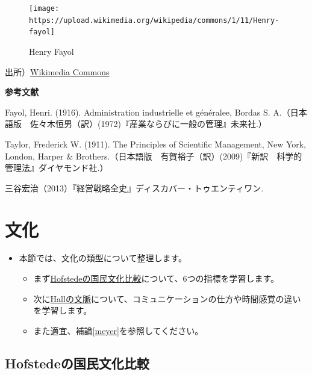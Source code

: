 \documentclass[
]{book}
\begin{document}
\begin{figure}
\texttt{[image: https://upload.wikimedia.org/wikipedia/commons/1/11/Henry-fayol]} \caption{Henry Fayol}\label{fig:hfayol}
\end{figure}

出所）\href{https://commons.wikimedia.org/wiki/File:Henry-fayol.jpg}{Wikimedia Commons}

{\textbf{参考文献}}

Fayol, Henri. (1916). Administration industrielle et généralee, Bordas S. A.（日本語版　佐々木恒男（訳）(1972)『産業ならびに一般の管理』未来社.）

Taylor, Frederick W. (1911). The Principles of Scientific Management, New York, London, Harper \& Brothers.（日本語版　有賀裕子（訳）(2009)『新訳　科学的管理法』ダイヤモンド社.）

三谷宏治（2013）『経営戦略全史』ディスカバー・トゥエンティワン.

\hypertarget{culture}{%
\section{文化}\label{culture}}

\begin{itemize}
\item
  本節では、文化の類型について整理します。

  \begin{itemize}
  \item
    まず\protect\hyperlink{hofstede}{Hofstedeの国民文化比較}について、6つの指標を学習します。
  \item
    次に\protect\hyperlink{hall}{Hallの文脈}について、コミュニケーションの仕方や時間感覚の違いを学習します。
  \item
    また適宜、補論\ref{meyer}を参照してください。
  \end{itemize}
\end{itemize}

\hypertarget{hofstede}{%
\subsection{Hofstedeの国民文化比較}\label{hofstede}}
\end{document}
